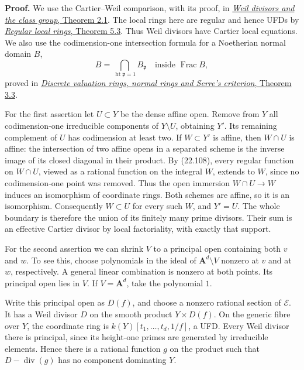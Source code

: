 \documentclass[
  11pt,
  a4paper,
]{article}
\begin{document}
\textbf{Proof.} We use the Cartier--Weil comparison, with its proof, in
\href{https://kokunoyumeto.github.io/open-math-courses-public/courses/AG-MO/weil-divisors-and-the-class-group.html\#2-the-divisor-of-a-line-bundle-section}{\emph{Weil
divisors and the class group}, Theorem 2.1}. The local rings here are
regular and hence UFDs by
\href{https://kokunoyumeto.github.io/open-math-courses-public/courses/AG-CA/AG-CA-14.html\#5-from-free-resolutions-to-principal-ideals}{\emph{Regular
local rings}, Theorem 5.3}. Thus Weil divisors have Cartier local
equations. We also use the codimension-one intersection formula for a
Noetherian normal domain \(B\), \[
 B=\bigcap_{\operatorname{ht}\mathfrak p=1}B_{\mathfrak p}
        \quad\text{inside }\operatorname{Frac}B,
 \tag{22.108}
\] proved in \href{https://kokunoyumeto.github.io/open-math-courses-public/courses/AG-CA/AG-CA-15.html}{\emph{Discrete valuation
rings, normal rings and Serre's criterion}, Theorem 3.3}.

For the first assertion let \(U\subset Y\) be the dense affine open.
Remove from \(Y\) all codimension-one irreducible components of
\(Y\setminus U\), obtaining \(Y'\). Its remaining complement of \(U\)
has codimension at least two. If \(W\subset Y'\) is affine, then
\(W\cap U\) is affine: the intersection of two affine opens in a
separated scheme is the inverse image of its closed diagonal in their
product. By (22.108), every regular function on \(W\cap U\), viewed as a
rational function on the integral \(W\), extends to \(W\), since no
codimension-one point was removed. Thus the open immersion
\(W\cap U\to W\) induces an isomorphism of coordinate rings. Both
schemes are affine, so it is an isomorphism. Consequently \(W\subset U\)
for every such \(W\), and \(Y'=U\). The whole boundary is therefore the
union of its finitely many prime divisors. Their sum is an effective
Cartier divisor by local factoriality, with exactly that support.

For the second assertion we can shrink \(V\) to a principal open
containing both \(v\) and \(w\). To see this, choose polynomials in the
ideal of \(\mathbf A^d\setminus V\) nonzero at \(v\) and at \(w\),
respectively. A general linear combination is nonzero at both points.
Its principal open lies in \(V\). If \(V=\mathbf A^d\), take the
polynomial \(1\).

Write this principal open as \(D(f)\), and choose a nonzero rational
section of \(\mathcal E\). It has a Weil divisor \(D\) on the smooth
product \(Y\times D(f)\). On the generic fibre over \(Y\), the
coordinate ring is \(k(Y)[t_1,\ldots,t_d,1/f]\), a UFD. Every Weil
divisor there is principal, since its height-one primes are generated by
irreducible elements. Hence there is a rational function \(g\) on the
product such that \(D-\operatorname{div}(g)\) has no component
dominating \(Y\).
\end{document}
